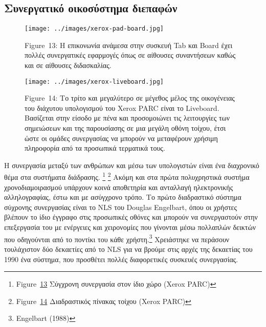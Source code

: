 \documentclass[
]{article}
\begin{document}
\hypertarget{ux3c3ux3c5ux3bdux3b5ux3c1ux3b3ux3b1ux3c4ux3b9ux3baux3cc-ux3bfux3b9ux3baux3bfux3c3ux3cdux3c3ux3c4ux3b7ux3bcux3b1-ux3b4ux3b9ux3b5ux3c0ux3b1ux3c6ux3ceux3bd}{%
\subsection{Συνεργατικό οικοσύστημα
διεπαφών}\label{ux3c3ux3c5ux3bdux3b5ux3c1ux3b3ux3b1ux3c4ux3b9ux3baux3cc-ux3bfux3b9ux3baux3bfux3c3ux3cdux3c3ux3c4ux3b7ux3bcux3b1-ux3b4ux3b9ux3b5ux3c0ux3b1ux3c6ux3ceux3bd}}

\leavevmode{}%
\begin{figure}
\hypertarget{fig:xerox-pad-board}{%
\centering
\texttt{[image: ../images/xerox-pad-board.jpg]}
\caption{Figure~13: Η επικονωνία ανάμεσα στην συσκευή Tab και Board έχει
πολλές συνεργατικές εφαρμογές όπως σε αίθουσες συναντήσεων καθώς και σε
αίθουσες διδασκαλίας.}\label{fig:xerox-pad-board}
}
\end{figure}

\leavevmode{}%
\begin{figure}
\hypertarget{fig:xerox-liveboard}{%
\centering
\texttt{[image: ../images/xerox-liveboard.jpg]}
\caption{Figure~14: Το τρίτο και μεγαλύτερο σε μέγεθος μέλος της
οικογένειας του διάχυτου υπολογισμού του Xerox PARC είναι το Liveboard.
Βασίζεται στην είσοδο με πένα και προσομοιώνει τις λειτουργίες των
σημειώσεων και της παρουσίασης σε μια μεγάλη οθόνη τοίχου, έτσι ώστε οι
ομάδες συνεργασίας να μπορούν να μεταφέρουν χρήσιμη πληροφορία από τα
προσωπικά τερματικά τους.}\label{fig:xerox-liveboard}
}
\end{figure}

Η συνεργασία μεταξύ των ανθρώπων και μέσω των υπολογιστών είναι ένα
διαχρονικό θέμα στα συστήματα διάδρασης. \footnote{Figure~\protect\hyperlink{fig:xerox-pad-board}{13}
  Σύγχρονη συνεργασία στον ίδιο χώρο (Xerox PARC)} \footnote{Figure~\protect\hyperlink{fig:xerox-liveboard}{14}
  Διαδραστικός πίνακας τοίχου (Xerox PARC)} Ακόμη και στα πρώτα
πολυχρηστικά συστήμα χρονοδιαμοιρασμού υπάρχουν κοινά αποθετηρία και
ανταλλαγή ηλεκτρονικής αλληλογραφίας, έστω και με ασύγχρονο τρόπο. Το
πρώτο διαδραστικό σύστημα σύχρονης συνεργασίας είναι το NLS του Douglas
Engelbart, όπου οι χρήστες βλέπουν το ίδιο έγγραφο στις προσωπικές
οθόνες και μπορούν να συνεργαστούν στην επεξεργασία του με ενέργειες και
χειρονομίες που γίνονται μέσω πολλαπλών δεικτών που οδηγούνται από το
ποντίκι του κάθε χρήστη.\footnote{Engelbart (1988)} Χρειάστηκε να
περάσουν τουλάχιστον δύο δεκαετίες από το NLS για να βρούμε στις αρχές
της δεκαετίας του 1990 ένα σύστημα, που προσθέτει πολλές διαφορετικές
συσκευές συνεργασίας.
\end{document}
